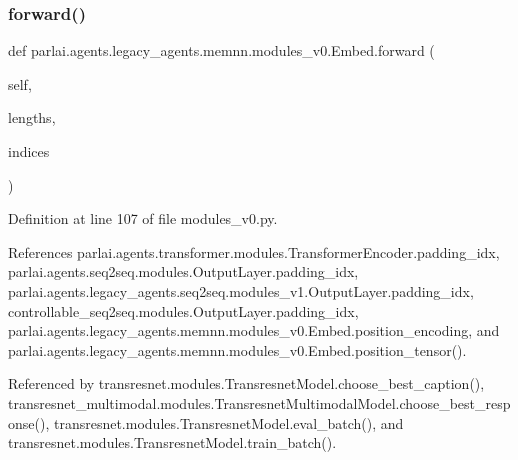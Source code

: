 \subsubsection{\texorpdfstring{forward()}{forward()}}
{\footnotesize\ttfamily def parlai.\+agents.\+legacy\+\_\+agents.\+memnn.\+modules\+\_\+v0.\+Embed.\+forward (\begin{DoxyParamCaption}\item[{}]{self,  }\item[{}]{lengths,  }\item[{}]{indices }\end{DoxyParamCaption})}



Definition at line 107 of file modules\+\_\+v0.\+py.



References parlai.\+agents.\+transformer.\+modules.\+Transformer\+Encoder.\+padding\+\_\+idx, parlai.\+agents.\+seq2seq.\+modules.\+Output\+Layer.\+padding\+\_\+idx, parlai.\+agents.\+legacy\+\_\+agents.\+seq2seq.\+modules\+\_\+v1.\+Output\+Layer.\+padding\+\_\+idx, controllable\+\_\+seq2seq.\+modules.\+Output\+Layer.\+padding\+\_\+idx, parlai.\+agents.\+legacy\+\_\+agents.\+memnn.\+modules\+\_\+v0.\+Embed.\+position\+\_\+encoding, and parlai.\+agents.\+legacy\+\_\+agents.\+memnn.\+modules\+\_\+v0.\+Embed.\+position\+\_\+tensor().



Referenced by transresnet.\+modules.\+Transresnet\+Model.\+choose\+\_\+best\+\_\+caption(), transresnet\+\_\+multimodal.\+modules.\+Transresnet\+Multimodal\+Model.\+choose\+\_\+best\+\_\+response(), transresnet.\+modules.\+Transresnet\+Model.\+eval\+\_\+batch(), and transresnet.\+modules.\+Transresnet\+Model.\+train\+\_\+batch().

